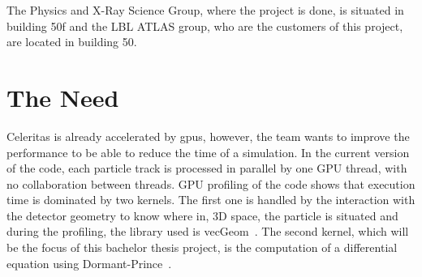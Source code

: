 The Physics and X-Ray Science Group, where the project is done, is situated in building 50f and the LBL ATLAS group, who are the customers of this project, are located in building 50.


\section{The Need}
\label{spec:ch:context:need}

Celeritas is already accelerated by \acrshort{gpu}s, however, the team wants to improve the performance to be able to reduce the time of a simulation.
In the current version of the code, each particle track is processed in parallel by one GPU thread, with no collaboration between threads.
GPU profiling of the code shows that execution time is dominated by two kernels.
The first one is handled by the interaction with the detector geometry to know where in, 3D space, the particle is situated and during the profiling, the library used is vecGeom~\cite{VecGeom}.
The second kernel, which will be the focus of this bachelor thesis project, is the computation of a differential equation using Dormant-Prince~\cite{princeDormand}.
